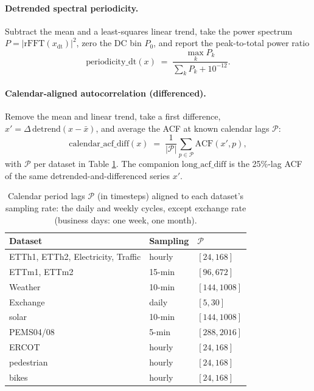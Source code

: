 \paragraph{Detrended spectral periodicity.} Subtract the mean and a least-squares linear trend, take the power spectrum $P = |\mathrm{rFFT}(x_{\mathrm{dt}})|^2$, zero the DC bin $P_0$, and report the peak-to-total power ratio
\begin{equation}
\mathrm{periodicity\_dt}(x) \;=\; \frac{\max_k P_k}{\sum_k P_k + 10^{-12}} .
\end{equation}

\paragraph{Calendar-aligned autocorrelation (differenced).} Remove the mean and linear trend, take a first difference, $x' = \Delta\,\mathrm{detrend}(x - \bar{x})$, and average the ACF at known calendar lags $\mathcal{P}$:
\begin{equation}
\mathrm{calendar\_acf\_diff}(x) \;=\; \frac{1}{|\mathcal{P}|} \sum_{p \in \mathcal{P}} \mathrm{ACF}(x', p),
\end{equation}
with $\mathcal{P}$ per dataset in Table \ref{tab:calendar}. The companion $\mathrm{long\_acf\_diff}$ is the 25\%-lag ACF of the same detrended-and-differenced series $x'$.

\begin{table}[t]
\caption{Calendar period lags $\mathcal{P}$ (in timesteps) aligned to each dataset's sampling rate: the daily and weekly cycles, except exchange rate (business days: one week, one month).}
\label{tab:calendar}
\centering\small
\begin{tabular}{lll}
\toprule
Dataset & Sampling & $\mathcal{P}$ \\
\midrule
ETTh1, ETTh2, Electricity, Traffic & hourly & $[24, 168]$ \\
ETTm1, ETTm2 & 15-min & $[96, 672]$ \\
Weather & 10-min & $[144, 1008]$ \\
Exchange & daily & $[5, 30]$ \\
solar & 10-min & $[144, 1008]$ \\
PEMS04/08 & 5-min & $[288, 2016]$ \\
ERCOT & hourly & $[24, 168]$ \\
pedestrian & hourly & $[24, 168]$ \\
bikes & hourly & $[24, 168]$ \\
\bottomrule
\end{tabular}
\end{table}

